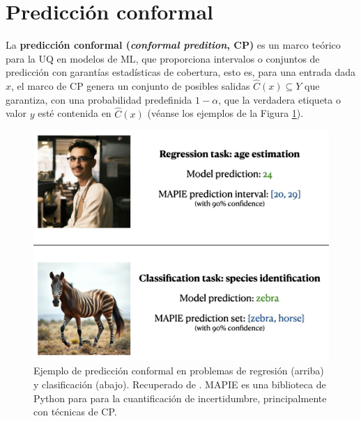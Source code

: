 \section{Predicción conformal}

La \textbf{predicción conformal (\textit{conformal predition}, \acrshort{CP})} \cite{vovk2005, angelopoulos2021} es un marco teórico para la \acrshort{UQ} en modelos de \acrshort{ML}, que proporciona intervalos o conjuntos de predicción con garantías estadísticas de cobertura, esto es, para una entrada dada $x$, el marco de \acrshort{CP} genera un conjunto de posibles salidas $\hat{C}(x) \subseteq Y$ que garantiza, con una probabilidad predefinida $1-\alpha$, que la verdadera etiqueta o valor $y$ esté contenida en $\hat{C}(x)$ (véanse los ejemplos de la Figura 
\ref{fig:educational_visual}).

\begin{figure}[htbp]
    \centering
    \includegraphics[width=\textwidth]{capitulos/cap_02/imagenes/educational_visual.png}
    \caption[
        Ejemplo de predicción conformal en problemas de regresión (arriba) y clasificación (abajo).
        Recuperado de \cite{mapie-docs2023}.
    ]{
        Ejemplo de predicción conformal en problemas de regresión (arriba) y clasificación (abajo).
        Recuperado de \cite{mapie-docs2023}. MAPIE es una biblioteca de Python para para la cuantificación
        de incertidumbre, principalmente con técnicas de \acrshort{CP}. 
    } 
    \label{fig:educational_visual}
\end{figure}


